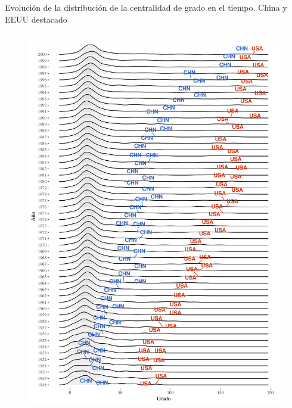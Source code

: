 \documentclass[compress]{beamer}
\begin{document}
\begin{frame}	
\small{Evolución de la distribución de la centralidad de grado en el tiempo. China y EEUU destacado}

\begin{columns}[c] 


\begin{figure}
\includegraphics[scale=0.25]{1950_2000_impo_densidad_USA_CHN_grado}
\end{figure}



\end{columns}
\end{frame}
\end{document}

